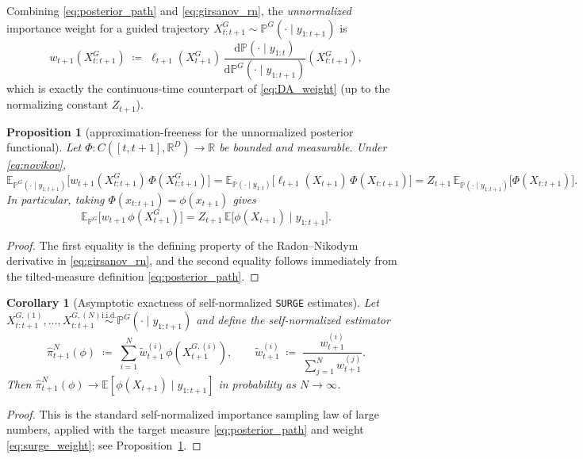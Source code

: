 \documentclass{article}
\newcommand{\E}{\mathbb{E}}
\newcommand{\dif}{{\mathrm{d}}}
\renewcommand{\P}{{\mathbb{P}}}
\newcommand{\R}{{\mathbb{R}}}
\theoremstyle{plain}
\newtheorem{proposition}[theorem]{Proposition}
\newtheorem{corollary}[theorem]{Corollary}
\theoremstyle{definition}
\theoremstyle{remark}
\begin{document}
Combining \eqref{eq:posterior_path} and \eqref{eq:girsanov_rn}, the \emph{unnormalized} importance weight
for a guided trajectory $X_{t:t+1}^G\sim \P^G(\cdot\mid y_{1:t+1})$ is
\begin{equation}
\label{eq:surge_weight}
w_{t+1}(X_{t:t+1}^G)
\;\coloneqq\;
\ell_{t+1}(X_{t+1}^G)\,
\frac{\dif \P(\cdot\mid y_{1:t})}{\dif \P^G(\cdot\mid y_{1:t+1})}(X_{t:t+1}^G),
\end{equation}
which is exactly the continuous-time counterpart of \eqref{eq:DA_weight} (up to the normalizing constant $Z_{t+1}$).

\begin{proposition}[approximation-freeness for the unnormalized posterior functional]
\label{prop:unnormalized}
Let $\Phi:C([t,t+1],\R^D)\to\R$ be bounded and measurable. Under \eqref{eq:novikov},
\begin{equation}
\label{eq:unnormalized_identity}
\E_{\P^G(\cdot\mid y_{1:t+1})}\!\Big[w_{t+1}(X_{t:t+1}^G)\,\Phi(X_{t:t+1}^G)\Big]
=
\E_{\P(\cdot\mid y_{1:t})}\!\Big[\ell_{t+1}(X_{t+1})\,\Phi(X_{t:t+1})\Big]
=
Z_{t+1}\,\E_{\P(\cdot\mid y_{1:t+1})}\!\Big[\Phi(X_{t:t+1})\Big].
\end{equation}
In particular, taking $\Phi(x_{t:t+1})=\phi(x_{t+1})$ gives
\[
\E_{\P^G}\!\Big[w_{t+1}\,\phi(X_{t+1}^G)\Big]
=
Z_{t+1}\,\E\!\big[\phi(X_{t+1})\mid y_{1:t+1}\big].
\]
\end{proposition}

\begin{proof}
The first equality is the defining property of the Radon--Nikodym derivative in \eqref{eq:girsanov_rn},
and the second equality follows immediately from the tilted-measure definition \eqref{eq:posterior_path}.
\end{proof}

\begin{corollary}[Asymptotic exactness of self-normalized \texttt{SURGE} estimates]
\label{cor:sn_is}
Let $X_{t:t+1}^{G,(1)},\dots,X_{t:t+1}^{G,(N)}\overset{\text{i.i.d.}}{\sim}\P^G(\cdot\mid y_{1:t+1})$ and
define the self-normalized estimator
\[
\hat\pi_{t+1}^N(\phi)\;\coloneqq\;\sum_{i=1}^N \tilde w_{t+1}^{(i)}\,\phi\!\left(X_{t+1}^{G,(i)}\right),
\qquad
\tilde w_{t+1}^{(i)}\;\coloneqq\;\frac{w_{t+1}^{(i)}}{\sum_{j=1}^N w_{t+1}^{(j)}}.
\]
Then $\hat\pi_{t+1}^N(\phi)\to \E[\phi(X_{t+1})\mid y_{1:t+1}]$ in probability as $N\to\infty$.
\end{corollary}

\begin{proof}
This is the standard self-normalized importance sampling law of large numbers, applied with the target
measure \eqref{eq:posterior_path} and weight \eqref{eq:surge_weight}; see Proposition~\ref{prop:unnormalized}.
\end{proof}
\end{document}
